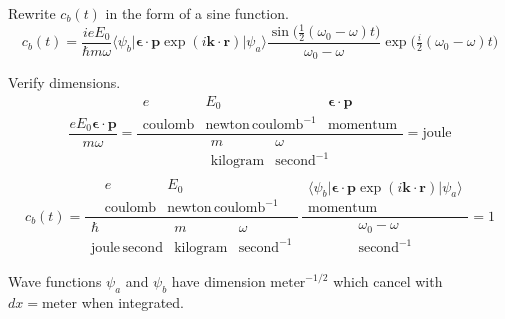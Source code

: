 Rewrite $c_b(t)$ in the form of a sine function.
\begin{equation*}
c_b(t)=\frac{ieE_0}{\hbar m\omega}
\langle\psi_b|\boldsymbol{\epsilon}\cdot\mathbf p\exp(i\mathbf k\cdot\mathbf r)|\psi_a\rangle
\frac{\sin\bigl(\tfrac{1}{2}(\omega_0-\omega)t\bigr)}{\omega_0-\omega}
\exp\bigl(\tfrac{i}{2}(\omega_0-\omega)t\bigr)
\tag{2}
\end{equation*}

Verify dimensions.
\begin{equation*}
\frac{eE_0\boldsymbol{\epsilon}\cdot\mathbf p}{m\omega}
=\frac{
\begin{matrix}
e & E_0 & \boldsymbol{\epsilon}\cdot\mathbf p
\\
\text{coulomb}
& \text{newton}\,\text{coulomb}^{-1}
& \text{momentum}
\end{matrix}
}{
\begin{matrix}
m & \omega
\\
\text{kilogram} & \text{second}^{-1}
\end{matrix}
}=\text{joule}
\end{equation*}
%
\begin{equation*}
c_b(t)=\frac{
\begin{matrix}
e & E_0
\\
\text{coulomb} & \text{newton}\,\text{coulomb}^{-1}
\end{matrix}
}{
\begin{matrix}
\hbar & m & \omega
\\
\text{joule}\,\text{second} & \text{kilogram} &\text{second}^{-1}
\end{matrix}
}
\,
\frac{
\begin{matrix}
\\
\langle\psi_b|\boldsymbol{\epsilon}\cdot\mathbf p\exp(i\mathbf k\cdot\mathbf r)|\psi_a\rangle
\\
\text{momentum}
\end{matrix}
}{
\begin{matrix}
\omega_0-\omega
\\
\text{second}^{-1}
\end{matrix}
}
=1
\end{equation*}

Wave functions $\psi_a$ and $\psi_b$ have dimension $\text{meter}^{-1/2}$
which cancel with $dx=\text{meter}$ when integrated.


